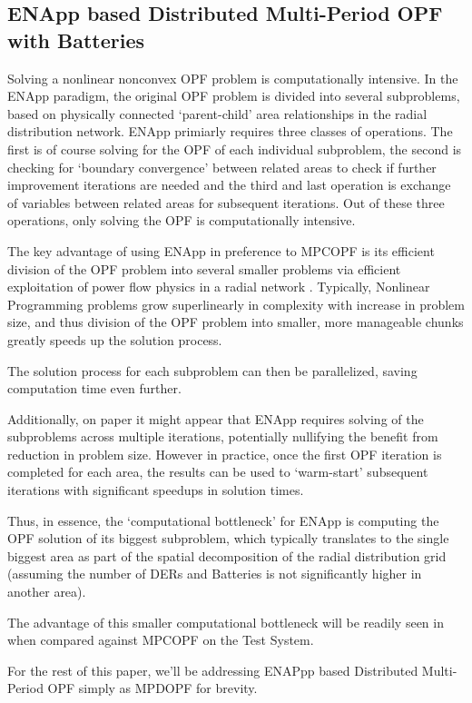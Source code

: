 \documentclass[../../outputs/main.tex]{subfiles}
\begin{document}


\subsection{ENApp based Distributed Multi-Period OPF with Batteries} \label{subsec:ENApp}

Solving a nonlinear nonconvex OPF problem is computationally intensive. In the ENApp paradigm, the original OPF problem is divided into several subproblems, based on physically connected `parent-child' area relationships in the radial distribution network. ENApp primiarly requires three classes of operations. The first is of course solving for the OPF of each individual subproblem, the second is checking for `boundary convergence' between related areas to check if further improvement iterations are needed and the third and last operation is exchange of variables between related areas for subsequent iterations. Out of these three operations, only solving the OPF is computationally intensive. 

The key advantage of using ENApp in preference to MPCOPF is its efficient division of the OPF problem into several smaller problems via efficient exploitation of power flow physics in a radial network \cite{Sadnan}. Typically, Nonlinear Programming problems grow superlinearly in complexity with increase in problem size, and thus division of the OPF problem into smaller, more manageable chunks greatly speeds up the solution process.

The solution process for each subproblem can then be parallelized, saving computation time even further.

Additionally, on paper it might appear that ENApp requires solving of the subproblems across multiple iterations, potentially nullifying the benefit from reduction in problem size. However in practice, once the first OPF iteration is completed for each area, the results can be used to `warm-start' subsequent iterations with significant speedups in solution times.

Thus, in essence, the `computational bottleneck' for ENApp is computing the OPF solution of its biggest subproblem, which typically translates to the single biggest area as part of the spatial decomposition of the radial distribution grid (assuming the number of DERs and Batteries is not significantly higher in another area).

The advantage of this smaller computational bottleneck will be readily seen in  when compared against MPCOPF on the Test System. 

For the rest of this paper, we'll be addressing ENAPpp based Distributed Multi-Period OPF simply as MPDOPF for brevity.
\end{document}
